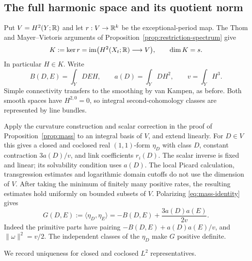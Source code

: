 \subsection{The full harmonic space and its quotient norm}
Put $V=H^2(Y;\mathbb R)$ and let $r:V\to\mathbb R^k$ be the exceptional-period
map. The Thom and Mayer--Vietoris arguments of
Proposition~\ref{prop:restriction-spectrum} give
\[
 K:=\ker r=\operatorname{im}\bigl(H^2(X_t;\mathbb R)\longrightarrow V\bigr),
 \qquad \dim K=s.
\]
In particular $H\in K$. Write
\begin{equation}\label{eq:full-intersection-forms}
 B(D,E)=\int_YDEH,\qquad a(D)=\int_YDH^2,\qquad v=\int_YH^3.
\end{equation}
Simple connectivity transfers to the smoothing by van Kampen, as before.
Both smooth spaces have $H^{2,0}=0$, so integral second-cohomology
classes are represented by line bundles.

Apply the curvature construction and scalar correction in the proof of
Proposition~\ref{prop:mass} to an integral basis of $V$, and extend
linearly. For $D\in V$ this gives a closed and coclosed real $(1,1)$-form
$\eta_D$ with class $D$, constant contraction $3a(D)/v$, and link
coefficients $r_i(D)$. The scalar inverse is fixed and linear; its
solvability condition uses $a(D)$. The local Picard calculation,
transgression estimates and logarithmic domain cutoffs do not use the
dimension of $V$. After taking the minimum of finitely many positive
rates, the resulting estimates hold uniformly on bounded subsets of $V$.
Polarizing \eqref{eq:mass-identity} gives
\begin{equation}\label{eq:full-harmonic-gram}
 G(D,E):=\langle\eta_D,\eta_E\rangle
 =-B(D,E)+\frac{3a(D)a(E)}{2v}.
\end{equation}
Indeed the primitive parts have pairing
$-B(D,E)+a(D)a(E)/v$, and $\|\omega\|^2=v/2$.
The independent classes of the $\eta_D$ make $G$ positive definite.

We record uniqueness for closed and coclosed $L^2$ representatives.

